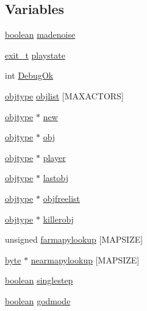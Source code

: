 \subsection*{Variables}
\begin{DoxyCompactItemize}
\item 
\hyperlink{ID__HEAD_8H_a7c6368b321bd9acd0149b030bb8275ed}{boolean} \hyperlink{WL__PLAY_8C_a4971e2bca2f2589e2a6a70d6d6c54caa}{madenoise}
\item 
\hyperlink{WL__DEF_8H_a1f5fa69e42ee452aa28c256fd25c33cf}{exit\_\-t} \hyperlink{WL__PLAY_8C_a7bc9cfbaebb2f8731fc6a008d5e02bff}{playstate}
\item 
int \hyperlink{WL__PLAY_8C_ae6eb42bd1f26cebf1f3e0d3d8bf8ff27}{DebugOk}
\item 
\hyperlink{structobjstruct}{objtype} \hyperlink{WL__PLAY_8C_a6e9f072b148ef10ec86e297a493110f2}{objlist} \mbox{[}MAXACTORS\mbox{]}
\item 
\hyperlink{structobjstruct}{objtype} $\ast$ \hyperlink{WL__PLAY_8C_aeef0824257f536812a114a0e932b654f}{new}
\item 
\hyperlink{structobjstruct}{objtype} $\ast$ \hyperlink{WL__PLAY_8C_af2676bb450cb1b81beed4d6cb5038ac1}{obj}
\item 
\hyperlink{structobjstruct}{objtype} $\ast$ \hyperlink{WL__PLAY_8C_aab35f908015a45224c5de99938b392f0}{player}
\item 
\hyperlink{structobjstruct}{objtype} $\ast$ \hyperlink{WL__PLAY_8C_afcd8a7c0f5c40f4a956efc9b5c0f7eb7}{lastobj}
\item 
\hyperlink{structobjstruct}{objtype} $\ast$ \hyperlink{WL__PLAY_8C_a0bbfafb17a6f027cbcd951f84a1bb2ee}{objfreelist}
\item 
\hyperlink{structobjstruct}{objtype} $\ast$ \hyperlink{WL__PLAY_8C_a93feadbaf779c18179439f73f406a0d9}{killerobj}
\item 
unsigned \hyperlink{WL__PLAY_8C_a2d3a9ae720f57b0ebde086d13cdb9af7}{farmapylookup} \mbox{[}MAPSIZE\mbox{]}
\item 
\hyperlink{ID__HEAD_8H_a0c8186d9b9b7880309c27230bbb5e69d}{byte} $\ast$ \hyperlink{WL__PLAY_8C_a3cee47da7077796a8215395d7bf23a8b}{nearmapylookup} \mbox{[}MAPSIZE\mbox{]}
\item 
\hyperlink{ID__HEAD_8H_a7c6368b321bd9acd0149b030bb8275ed}{boolean} \hyperlink{WL__PLAY_8C_a46d81099af6d10af477bc30272a05919}{singlestep}
\item 
\hyperlink{ID__HEAD_8H_a7c6368b321bd9acd0149b030bb8275ed}{boolean} \hyperlink{WL__PLAY_8C_a23bd83aac925fcfe8d07fc3bbbfc7969}{godmode}
\item 

\end{DoxyCompactItemize}
